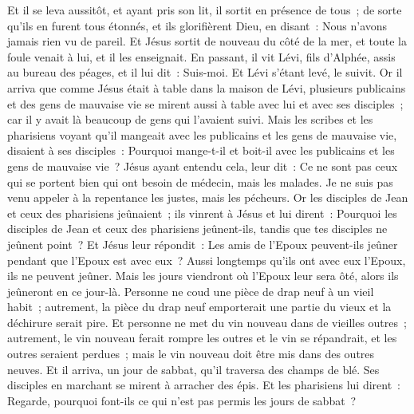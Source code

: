 \begin{multicols}{2}
Et il se leva aussitôt, et ayant pris son lit, il sortit en présence de tous~; de sorte qu'ils en furent tous étonnés, et ils glorifièrent Dieu, en disant~: Nous n'avons jamais rien vu de pareil.
Et Jésus sortit de nouveau du côté de la mer, et toute la foule venait à lui, et il les enseignait.
En passant, il vit Lévi, fils d'Alphée, assis au bureau des péages, et il lui dit~: Suis-moi. Et Lévi s'étant levé, le suivit.
Or il arriva que comme Jésus était à table dans la maison de Lévi, plusieurs publicains et des gens de mauvaise vie se mirent aussi à table avec lui et avec ses disciples~; car il y avait là beaucoup de gens qui l'avaient suivi.
Mais les scribes et les pharisiens voyant qu'il mangeait avec les publicains et les gens de mauvaise vie, disaient à ses disciples~: Pourquoi mange-t-il et boit-il avec les publicains et les gens de mauvaise vie~?
Jésus ayant entendu cela, leur dit~: Ce ne sont pas ceux qui se portent bien qui ont besoin de médecin, mais les malades. Je ne suis pas venu appeler à la repentance les justes, mais les pécheurs.
Or les disciples de Jean et ceux des pharisiens jeûnaient~; ils vinrent à Jésus et lui dirent~: Pourquoi les disciples de Jean et ceux des pharisiens jeûnent-ils, tandis que tes disciples ne jeûnent point~?
Et Jésus leur répondit~: Les amis de l'Epoux peuvent-ils jeûner pendant que l'Epoux est avec eux~? Aussi longtemps qu'ils ont avec eux l'Epoux, ils ne peuvent jeûner.
Mais les jours viendront où l'Epoux leur sera ôté, alors ils jeûneront en ce jour-là.
Personne ne coud une pièce de drap neuf à un vieil habit~; autrement, la pièce du drap neuf emporterait une partie du vieux et la déchirure serait pire.
Et personne ne met du vin nouveau dans de vieilles outres~; autrement, le vin nouveau ferait rompre les outres et le vin se répandrait, et les outres seraient perdues~; mais le vin nouveau doit être mis dans des outres neuves.
Et il arriva, un jour de sabbat, qu'il traversa des champs de blé. Ses disciples en marchant se mirent à arracher des épis.
Et les pharisiens lui dirent~: Regarde, pourquoi font-ils ce qui n'est pas permis les jours de sabbat~?

\end{multicols}
